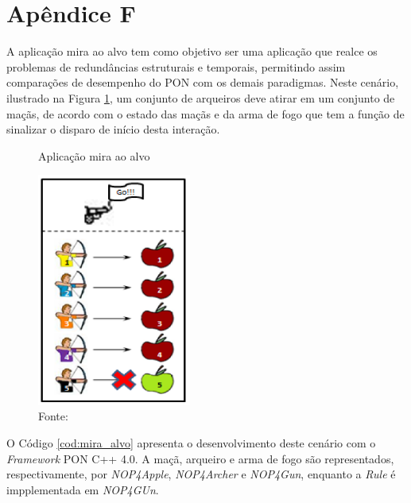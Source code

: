 


\chapter*{Apêndice F}\label{ap:apendice_mira_alvo}

A aplicação mira ao alvo tem como objetivo ser uma aplicação que realce os
problemas de redundâncias estruturais e temporais, permitindo assim comparações
de desempenho do PON com os demais paradigmas. Neste cenário, ilustrado na
Figura \ref{fig:mira_alvo2}, um conjunto de arqueiros deve atirar em um conjunto
de maçãs, de acordo com o estado das maçãs e da arma de fogo que tem a função de
sinalizar o disparo de início desta interação.

\begin{figure}[!htb]
\centering
\caption{Aplicação mira ao alvo}
\includegraphics[width=0.45\textwidth]{../figures/mira_alvo_2.PNG}
\smallskip
\caption*{Fonte: }
\label{fig:mira_alvo2}
\end{figure}

O Código \ref{cod:mira_alvo} apresenta o desenvolvimento deste cenário com o
\textit{Framework} PON C++ 4.0. A maçã, arqueiro e arma de fogo são
representados, respectivamente, por \textit{NOP4Apple}, \textit{NOP4Archer} e
\textit{NOP4Gun}, enquanto a \textit{Rule} é impplementada em \textit{NOP4GUn}.
  
